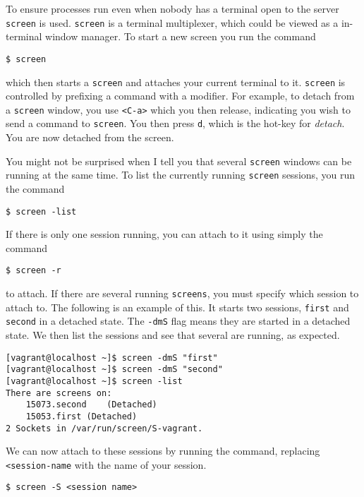 To ensure processes run even when nobody has a terminal open to the
server \texttt{screen} is used. \texttt{screen} is a terminal
multiplexer, which could be viewed as a in-terminal window manager. To
start a new screen you run the command

\begin{verbatim}
$ screen
\end{verbatim}

which then starts a \texttt{screen} and attaches your current terminal
to it. \texttt{screen} is controlled by prefixing a command with a
modifier. For example, to detach from a \texttt{screen} window, you use
\texttt{\textless{}C-a\textgreater{}} which you then release, indicating
you wish to send a command to \texttt{screen}. You then press
\texttt{d}, which is the hot-key for \emph{detach}. You are now detached
from the screen.

You might not be surprised when I tell you that several \texttt{screen}
windows can be running at the same time. To list the currently running
\texttt{screen} sessions, you run the command

\begin{verbatim}
$ screen -list
\end{verbatim}

If there is only one session running, you can attach to it using simply
the command

\begin{verbatim}
$ screen -r
\end{verbatim}

to attach. If there are several running \texttt{screens}, you must
specify which session to attach to. The following is an example of this.
It starts two sessions, \texttt{first} and \texttt{second} in a detached
state. The \texttt{-dmS} flag means they are started in a detached
state. We then list the sessions and see that several are running, as
expected.

\begin{verbatim}
[vagrant@localhost ~]$ screen -dmS "first"
[vagrant@localhost ~]$ screen -dmS "second"
[vagrant@localhost ~]$ screen -list
There are screens on:
    15073.second    (Detached)
    15053.first (Detached)
2 Sockets in /var/run/screen/S-vagrant.
\end{verbatim}

We can now attach to these sessions by running the command, replacing
\texttt{\textless{}session-name} with the name of your session.

\begin{verbatim}
$ screen -S <session name>
\end{verbatim}

